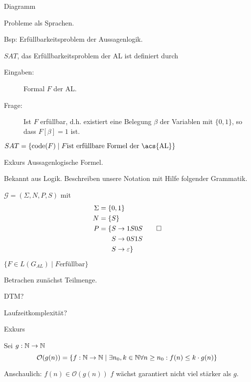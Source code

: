 {Diagramm

\bigskip

Probleme als Sprachen.

Bsp: Erfüllbarkeitsproblem der Aussagenlogik.

\begin{Def}[name={[$SAT$: Erfüllbarkeitsproblem der \acs*{AL}]}]
	$SAT$, das Erfüllbarkeitsproblem der \acf{AL} ist  definiert durch
	\begin{description}
	\item[Eingaben:] Formal $F$ der \acl{AL}.
	\item[Frage:] Ist $F$ erfüllbar, d.h. existiert eine Belegung $\beta$ der Variablen mit $\{0,1\}$, so dass $F[\beta]=1$ ist.
	\end{description}
	$SAT=\{\code(F) \mid F\text{ist erfüllbare Formel der \acs{AL}}\}$
\end{Def}

Exkurs Aussagenlogische Formel.

Bekannt aus Logik. Beschreiben unsere Notation mit Hilfe folgender Grammatik.

\begin{Bsp}\label{bsp:3.sameNumber}
  $\mathcal{G} = (\Sigma, N, P, S)$ mit
	\begin{align*}
		\Sigma &= \{ 0, 1 \}\\
		N &= \{S\}\\
		P &= \begin{aligned}[t]
      \{ S & \to 1S0S \\
        S & \to 0S1S \\
        S & \to \varepsilon
      \}
        \end{aligned}
      \qedhere
	\end{align*}
\end{Bsp}


$\{F\in L(G_{AL})\mid F \text{erfüllbar}\}$

Betrachen zunächst Teilmenge.

DTM?

Laufzeitkomplexität?

Exkurs
\begin{Def} Sei $g:\mathbb{N}\rightarrow\mathbb{N}$
$$\mathcal{O}(g(n)) = \{f:\mathbb{N}\rightarrow\mathbb{N} \mid \exists n_0, k\in\mathbb{N} \forall n\geq n_0: f(n)\leq k\cdot g(n)\}$$
\end{Def}

Anschaulich: $f(n)\in \mathcal{O}(g(n))$ $f$ wächst garantiert nicht viel stärker als $g$.


\bigskip

}

